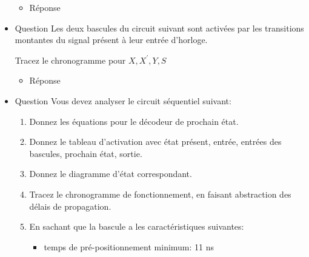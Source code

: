 \documentclass[letter, oneside]{book}
\begin{document}
\begin{itemize}
\begin{itemize}
\item Réponse
\label{sec:orge3fb8bd}
\begin{center}

\end{center}
\end{itemize}

\item Question
\label{sec:orgccf4b65}
Les deux bascules du circuit suivant sont activées par les
transitions montantes du signal présent à leur entrée
d'horloge.

\begin{center}

\end{center}

Tracez le chronogramme pour \(X, X^{\prime}, Y, S\)

\begin{itemize}
\item Réponse
\label{sec:org8b03eda}
\begin{center}

\end{center}
\end{itemize}

\item Question
\label{sec:orgcb6bf4f}
Vous devez analyser le circuit séquentiel suivant:

\begin{center}

\end{center}

\begin{enumerate}
\item Donnez les équations pour le décodeur de prochain état.

\item Donnez le tableau d'activation avec état présent, entrée, entrées
des bascules, prochain état, sortie.

\item Donnez le diagramme d'état correspondant.

\item Tracez le chronogramme de fonctionnement, en faisant abstraction
des délais de propagation.

\item En sachant que la bascule a les caractéristiques suivantes:

\begin{itemize}
\item temps de pré-positionnement minimum: 11 ns


\end{itemize}
\end{enumerate}
\end{itemize}
\end{document}
